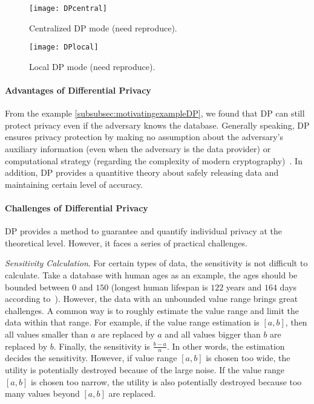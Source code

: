 \begin{figure}[htbp]
    \texttt{[image: DPcentral]}
    \centering
    \caption{Centralized DP mode (need reproduce).}
    \label{img:DPcentral}
\end{figure}
\FloatBarrier

\begin{figure}[htbp]
    \texttt{[image: DPlocal]}
    \centering
    \caption{Local DP mode (need reproduce).}
    \label{img:DPlocal}
\end{figure}
\FloatBarrier


\paragraph{Advantages of Differential Privacy}
From the example \autoref{subsubsec:motivatingexampleDP}, we found that DP can still protect privacy even if the adversary knows the database. Generally speaking, DP ensures privacy protection by making no assumption about the adversary's auxiliary information (even when the adversary is the data provider) or computational strategy (regarding the complexity of modern cryptography)~\cite{vadhan2017complexity}. In addition, DP provides a quantitive theory about safely releasing data and maintaining certain level of accuracy.

\paragraph{Challenges of Differential Privacy}
\label{subsubsec:challengesOfDP}
DP provides a method to guarantee and quantify individual privacy at the theoretical level. However, it faces a series of practical challenges.

\emph{Sensitivity Calculation}. For certain types of data, the sensitivity is not difficult to calculate. Take a database with human ages as an example, the ages should be bounded between $0$ and $150$ (longest human lifespan is $122$ years and $164$ days according to~\cite{whitney_1997}). However, the data with an unbounded value range brings great challenges. A common way is to roughly estimate the value range and limit the data within that range. For example, if the value range estimation is $\left[ a,b\right] $, then all values smaller than $a$ are replaced by $a$ and all values bigger than $b$ are replaced by $b$. Finally,  the sensitivity is $\frac{b- a}{n}$. In other words, the estimation decides the sensitivity. However, if value range $\left[ a,b\right] $ is chosen too wide, the utility is potentially destroyed because of the large noise. If the value range $\left[ a,b\right] $ is chosen too narrow, the utility is also potentially destroyed because too many values beyond $\left[ a,b\right] $ are replaced.

